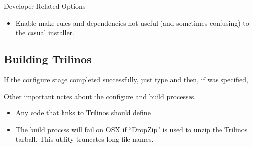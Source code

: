 Developer-Related Options
\begin{itemize}
\item {}

Enable make rules and dependencies not useful (and sometimes confusing) to 
the casual installer.
\end{itemize}

\subsection{Building Trilinos}

If the configure stage completed successfully, just type 
 and then, if 
 was specified, 

Other important notes about the configure and build processes.
\begin{itemize}
\item Any code that links to Trilinos should define 
.

\item The build process will fail on OSX if ``DropZip'' is used to 
unzip the Trilinos tarball.  This utility truncates long file names.

\end{itemize}

